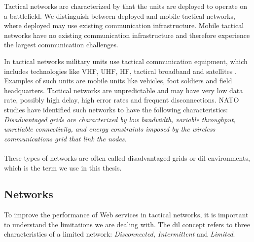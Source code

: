 Tactical networks are characterized by that the units are deployed to operate on
a battlefield. We distinguish between deployed and mobile tactical networks,
where deployed may use existing communication infrastructure. Mobile tactical
networks have no existing communication infrastructure and therefore experience
the largest communication challenges.

 In tactical networks military units use tactical communication equipment, which
 includes technologies like VHF, UHF, HF, tactical broadband and satellites
 \cite{ist-090}. Examples of such units are mobile units like vehicles, foot
 soldiers and field headquarters. Tactical networks are unpredictable and may
 have very low data rate, possibly high delay, high error rates and frequent
 disconnections. NATO studies\cite{nato-disadvantaged-grids} have identified
 such networks to have the following characteristics: \\

\textit{
Disadvantaged grids are characterized by low bandwidth, variable throughput,
unreliable connectivity, and energy constraints imposed by the wireless
communications grid that link the nodes.
}

\paragraph{}

These types of networks are often called disadvantaged grids or \gls{dil}
environments, which is the term we use in this thesis.

\subsection{ Networks}
\label{dil}

To improve the performance of Web services in tactical networks, it is important
to understand the limitations we are dealing with. The \gls{dil} concept refers
to three characteristics of a limited network: \textit{Disconnected,
Intermittent} and \textit{Limited}.

